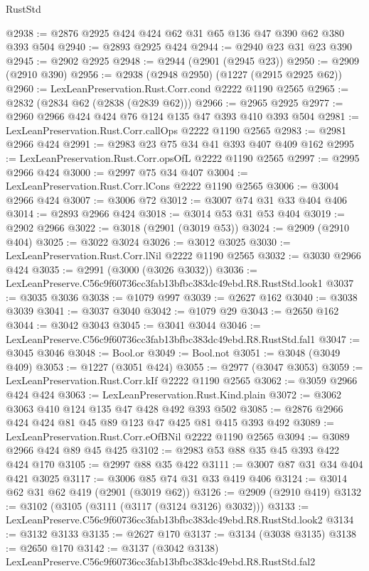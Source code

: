 \begin{lexlean}{RustStd}
\begin{coremodule}
@2938 := @2876 @2925 @424 @424 @62 @31 @65 @136 @47 @390 @62 @380 @393 @504
@2940 := @2893 @2925 @424
@2944 := @2940 @23 @31 @23 @390
@2945 := @2902 @2925
@2948 := @2944 (@2901 (@2945 @23))
@2950 := @2909 (@2910 @390)
@2956 := @2938 (@2948 @2950) (@1227 (@2915 @2925 @62))
@2960 := LexLeanPreservation.Rust.Corr.cond @2222 @1190 @2565
@2965 := @2832 (@2834 @62 (@2838 (@2839 @62)))
@2966 := @2965 @2925
@2977 := @2960 @2966 @424 @424 @76 @124 @135 @47 @393 @410 @393 @504
@2981 := LexLeanPreservation.Rust.Corr.callOps @2222 @1190 @2565
@2983 := @2981 @2966 @424
@2991 := @2983 @23 @75 @34 @41 @393 @407 @409 @162
@2995 := LexLeanPreservation.Rust.Corr.opsOfL @2222 @1190 @2565
@2997 := @2995 @2966 @424
@3000 := @2997 @75 @34 @407
@3004 := LexLeanPreservation.Rust.Corr.lCons @2222 @1190 @2565
@3006 := @3004 @2966 @424
@3007 := @3006 @72
@3012 := @3007 @74 @31 @33 @404 @406
@3014 := @2893 @2966 @424
@3018 := @3014 @53 @31 @53 @404
@3019 := @2902 @2966
@3022 := @3018 (@2901 (@3019 @53))
@3024 := @2909 (@2910 @404)
@3025 := @3022 @3024
@3026 := @3012 @3025
@3030 := LexLeanPreservation.Rust.Corr.lNil @2222 @1190 @2565
@3032 := @3030 @2966 @424
@3035 := @2991 (@3000 (@3026 @3032))
@3036 := LexLeanPreserve.C56c9f60736cc3fab13bfbc383dc49ebd.R8.RustStd.look1
@3037 := @3035 @3036
@3038 := @1079 @997
@3039 := @2627 @162
@3040 := @3038 @3039
@3041 := @3037 @3040
@3042 := @1079 @29
@3043 := @2650 @162
@3044 := @3042 @3043
@3045 := @3041 @3044
@3046 := LexLeanPreserve.C56c9f60736cc3fab13bfbc383dc49ebd.R8.RustStd.fal1
@3047 := @3045 @3046
@3048 := Bool.or
@3049 := Bool.not
@3051 := @3048 (@3049 @409)
@3053 := @1227 (@3051 @424)
@3055 := @2977 (@3047 @3053)
@3059 := LexLeanPreservation.Rust.Corr.kIf @2222 @1190 @2565
@3062 := @3059 @2966 @424 @424
@3063 := LexLeanPreservation.Rust.Kind.plain
@3072 := @3062 @3063 @410 @124 @135 @47 @428 @492 @393 @502
@3085 := @2876 @2966 @424 @424 @81 @45 @89 @123 @47 @425 @81 @415 @393 @492
@3089 := LexLeanPreservation.Rust.Corr.eOfBNil @2222 @1190 @2565
@3094 := @3089 @2966 @424 @89 @45 @425
@3102 := @2983 @53 @88 @35 @45 @393 @422 @424 @170
@3105 := @2997 @88 @35 @422
@3111 := @3007 @87 @31 @34 @404 @421 @3025
@3117 := @3006 @85 @74 @31 @33 @419 @406
@3124 := @3014 @62 @31 @62 @419 (@2901 (@3019 @62))
@3126 := @2909 (@2910 @419)
@3132 := @3102 (@3105 (@3111 (@3117 (@3124 @3126) @3032)))
@3133 := LexLeanPreserve.C56c9f60736cc3fab13bfbc383dc49ebd.R8.RustStd.look2
@3134 := @3132 @3133
@3135 := @2627 @170
@3137 := @3134 (@3038 @3135)
@3138 := @2650 @170
@3142 := @3137 (@3042 @3138) LexLeanPreserve.C56c9f60736cc3fab13bfbc383dc49ebd.R8.RustStd.fal2

\end{coremodule}
\end{lexlean}
